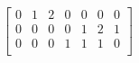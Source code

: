 \documentclass{article}
\begin{document}
 $
\left[
\begin{array}{c|c|c|c|c|c|c}
0 & 1 & 2 & 0 & 0 & 0 & 0 \\
0 & 0 & 0 & 0 & 1 & 2 & 1 \\
0 & 0 & 0 & 1 & 1 & 1 & 0 \\
\end{array}
\right] $
\end{document}
